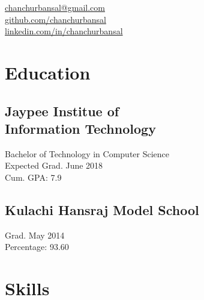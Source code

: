 \documentclass[]{hieudo-build}
\begin{document}
%
%
{
	\faEnvelope \href{mailto:chanchurbansal@gmail.com}{ chanchurbansal@gmail.com}\\
	\faGithub \href{https://github.com/chanchurbansal}{ github.com/chanchurbansal}\\
	\faLinkedinSquare \href{https://www.linkedin.com/in/chanchurbansal/}{ linkedin.com/in/chanchurbansal}
    
}


    
%
%
\begin{minipage}[t]{0.3\textwidth} 

\section{Education} 

\subsection[Jaypee Institue of Information Technology]{Jaypee Institue of \\Information Technology}
Bachelor of Technology in Computer Science \\
Expected Grad. June 2018 \\
Cum. GPA: 7.9\\
\sectionsep

\subsection{Kulachi Hansraj Model School}
Grad. May 2014  
\\ Percentage: 93.60
\sectionsep


\section{Skills}

\end{minipage}
\end{document}
